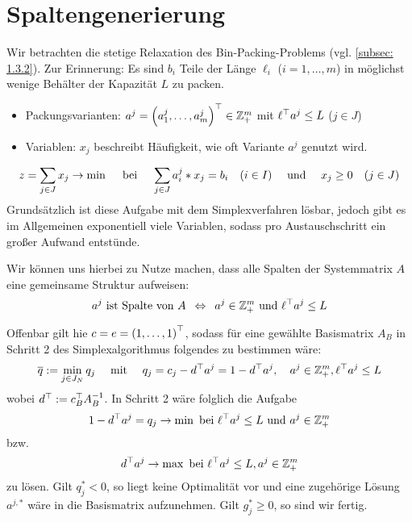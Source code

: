 \section{Spaltengenerierung}

Wir betrachten die stetige Relaxation des Bin-Packing-Problems (vgl. \cref{subsec: 1.3.2}). Zur Erinnerung: Es sind $b_i$ Teile der Länge $\ell_i$ ($i = 1, \dots, m$) in möglichst wenige Behälter der Kapazität $L$ zu packen. 
\begin{itemize}[nolistsep, topsep=-\parskip]
	\item Packungsvarianten: $a^j = \left( a_1^j , \dots , a_m^j \right)^{\top} \in \mathbb{Z}_+^m$ mit $\ell^{\top}a^j \le L$ ($j \in J$)
	\item Variablen: $x_j$ beschreibt Häufigkeit, wie oft Variante $a^j$ genutzt wird.
\end{itemize}
\begin{equation*}
	z = \sum_{j \in  J} x_j \to \min \quad \text{ bei } \quad \sum_{j \in J} a_i^j * x_j = b_i \quad (i \in I) \quad \text{ und } \quad x_j \ge 0 \quad (j \in J)
\end{equation*}
Grundsätzlich ist diese Aufgabe mit dem Simplexverfahren lösbar, jedoch gibt es im Allgemeinen exponentiell viele Variablen, sodass pro Austauschschritt ein großer Aufwand entstünde.

Wir können uns hierbei zu Nutze machen, dass alle Spalten der Systemmatrix $A$ eine gemeinsame Struktur aufweisen:
\begin{equation*}
	a^j \text{ ist Spalte von } A \enskip \Leftrightarrow \enskip a^j \in \mathbb{Z}_+^m \text{ und } \ell^{\top} a^j \le L
\end{equation*}

Offenbar gilt hie $c = e = \left( 1, \dots, 1 \right)^{\top}$, sodass für eine gewählte Basismatrix $A_B$ in Schritt 2 des Simplexalgorithmus folgendes zu bestimmen wäre:
\begin{equation*}
	\overline{q} \mathrel{:=} \min_{j \in J_N} q_j \quad \text{ mit } \quad q_j = c_j - d^{\top} a^j = 1 - d^{\top}a^j, \quad a^j \in \mathbb{Z}_+^m, \ell^{\top} a^j \le L
\end{equation*}
wobei $d^{\top} \mathrel{:=} c_B^{\top} A_B^{-1}$. In Schritt 2 wäre folglich die Aufgabe 
\begin{equation*}
	1 - d^{\top} a^j = q_j \to \min \text{ bei } \ell^{\top} a^j \le L \text{ und } a^j \in \mathbb{Z}_+^m
\end{equation*}
bzw. 
\begin{equation*}
	d^{\top} a^j \to \max \text{ bei } \ell^{\top} a^j \le L, a^j \in \mathbb{Z}_+^m
\end{equation*}
zu lösen.
Gilt $q_j^\ast < 0$, so liegt keine Optimalität vor und eine zugehörige Lösung $a^{j, \ast}$ wäre in die Basismatrix aufzunehmen. Gilt $g_j^\ast \ge 0$, so sind wir fertig.